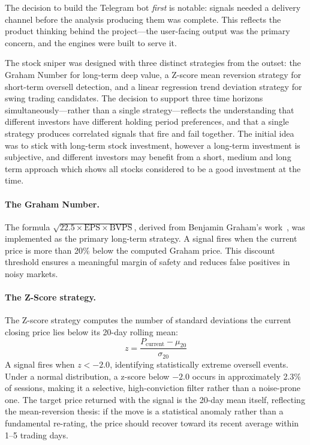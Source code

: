 \documentclass[12pt,a4paper]{article}
\begin{document}
The decision to build the Telegram bot \textit{first} is notable: signals needed a delivery channel before the analysis producing them was complete. This reflects the product thinking behind the project---the user-facing output was the primary concern, and the engines were built to serve it.

The stock sniper was designed with three distinct strategies from the outset: the Graham Number for long-term deep value, a Z-score mean reversion strategy for short-term oversell detection, and a linear regression trend deviation strategy for swing trading candidates. The decision to support three time horizons simultaneously---rather than a single strategy---reflects the understanding that different investors have different holding period preferences, and that a single strategy produces correlated signals that fire and fail together. The initial idea was to stick with long-term stock investment, however a long-term investment is subjective, and different investors may benefit from a short, medium and long term approach which shows all stocks considered to be a good investment at the time.

\paragraph{The Graham Number.} The formula $\sqrt{22.5 \times \text{EPS} \times \text{BVPS}}$, derived from Benjamin Graham's work~\cite{graham1934,graham1949}, was implemented as the primary long-term strategy. A signal fires when the current price is more than 20\% below the computed Graham price. This discount threshold ensures a meaningful margin of safety and reduces false positives in noisy markets.


\paragraph{The Z-Score strategy.} The Z-score strategy computes the number of standard deviations the current closing price lies below its 20-day rolling mean:
\[
z = \frac{P_{\text{current}} - \mu_{20}}{\sigma_{20}}
\]
A signal fires when $z < -2.0$, identifying statistically extreme oversell events. Under a normal distribution, a z-score below $-2.0$ occurs in approximately 2.3\% of sessions, making it a selective, high-conviction filter rather than a noise-prone one. The target price returned with the signal is the 20-day mean itself, reflecting the mean-reversion thesis: if the move is a statistical anomaly rather than a fundamental re-rating, the price should recover toward its recent average within 1--5 trading days.
\end{document}
